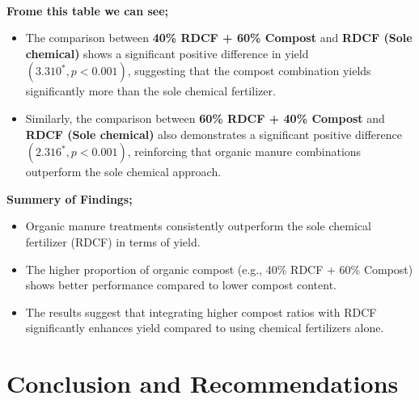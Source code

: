 \documentclass[oneside,12pt,fleqn]{book}
\begin{document}
\\
\textbf{Frome this table we can see;} \\
\begin{itemize}
    \item The comparison between \textbf{40\% RDCF + 60\% Compost} and \textbf{RDCF (Sole chemical)} shows a significant positive difference in yield \((3.310^{*}, p < 0.001)\), suggesting that the compost combination yields significantly more than the sole chemical fertilizer.
    \item Similarly, the comparison between \textbf{60\% RDCF + 40\% Compost} and \textbf{RDCF (Sole chemical)} also demonstrates a significant positive difference \((2.316^{*}, p < 0.001)\), reinforcing that organic manure combinations outperform the sole chemical approach.
\end{itemize}
\textbf{Summery of Findings;}\\
\begin{itemize}
    \item Organic manure treatments consistently outperform the sole chemical fertilizer (RDCF) in terms of yield.
    \item The higher proportion of organic compost (e.g., 40\% RDCF + 60\% Compost) shows better performance compared to lower compost content.
    \item The results suggest that integrating higher compost ratios with RDCF significantly enhances yield compared to using chemical fertilizers alone.
\end{itemize}





\chapter{Conclusion and Recommendations}
\end{document}
